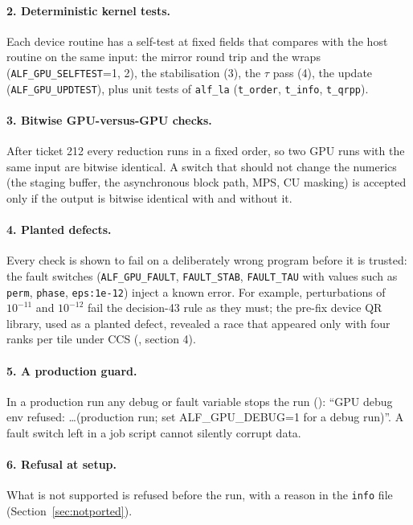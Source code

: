 \paragraph{2. Deterministic kernel tests.} Each device routine has a self-test at fixed fields that compares with the host routine on the same input: the mirror round trip and the wraps (\texttt{ALF\_GPU\_SELFTEST}=1, 2), the stabilisation (3), the $\tau$ pass (4), the update (\texttt{ALF\_GPU\_UPDTEST}), plus unit tests of \texttt{alf\_la} (\texttt{t\_order}, \texttt{t\_info}, \texttt{t\_qrpp}).

\paragraph{3. Bitwise GPU-versus-GPU checks.} After ticket 212 every reduction runs in a fixed order, so two GPU runs with the same input are bitwise identical. A switch that should not change the numerics (the staging buffer, the asynchronous block path, MPS, CU masking) is accepted only if the output is bitwise identical with and without it.

\paragraph{4. Planted defects.} Every check is shown to fail on a deliberately wrong program before it is trusted: the fault switches (\texttt{ALF\_GPU\_FAULT}, \texttt{FAULT\_STAB}, \texttt{FAULT\_TAU} with values such as \texttt{perm}, \texttt{phase}, \texttt{eps:1e-12}) inject a known error. For example, perturbations of $10^{-11}$ and $10^{-12}$ fail the decision-43 rule as they must; the pre-fix device QR library, used as a planted defect, revealed a race that appeared only with four ranks per tile under CCS (, section 4).

\paragraph{5. A production guard.} In a production run any debug or fault variable stops the run (): ``GPU debug env refused: \ldots (production run; set ALF\_GPU\_DEBUG=1 for a debug run)''. A fault switch left in a job script cannot silently corrupt data.

\paragraph{6. Refusal at setup.} What is not supported is refused before the run, with a reason in the \texttt{info} file (Section~\ref{sec:notported}).

